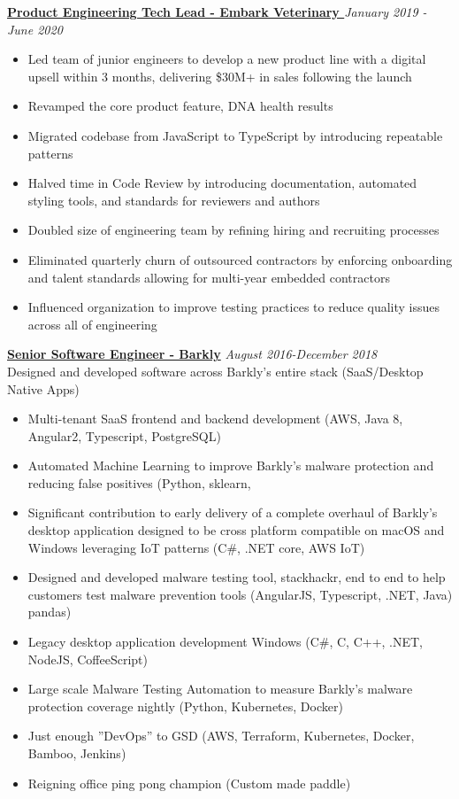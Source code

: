 \documentclass[line]{res}
\begin{document}
\begin{resume}
{\bf \underline{Product Engineering Tech Lead - Embark Veterinary }} \hfill {\sl January 2019 - June 2020}\\[2pt]
 \begin{itemize} \itemsep -1pt %
	\item Led team of junior engineers to develop a new product line with a digital upsell within 3 months, delivering \$30M+ in sales following the launch
	\item Revamped the core product feature, DNA health results
	\item Migrated codebase from JavaScript to TypeScript by introducing repeatable patterns
	\item Halved time in Code Review by introducing documentation, automated styling tools, and standards for reviewers and authors
	\item Doubled size of engineering team by refining hiring and recruiting processes
	\item Eliminated quarterly churn of outsourced contractors by enforcing onboarding and talent standards allowing for multi-year embedded contractors
	\item Influenced organization to improve testing practices to reduce quality issues across all of engineering
 \end{itemize}
 
{\bf \underline{Senior Software Engineer - Barkly}} \hfill {\sl August 2016-December 2018}\\[2pt]
Designed and developed software across Barkly's entire stack (SaaS/Desktop Native Apps)
 \begin{itemize} \itemsep -1pt %
	\item Multi-tenant SaaS frontend and backend development (AWS, Java 8, Angular2, Typescript, PostgreSQL)
	\item Automated Machine Learning to improve Barkly’s malware protection and reducing false positives (Python, sklearn,
	\item Significant contribution to early delivery of a complete overhaul of Barkly’s desktop application designed to be
cross platform compatible on macOS and Windows leveraging IoT patterns (C\#, .NET core, AWS IoT)
	\item Designed and developed malware testing tool, stackhackr, end to end to help customers test malware prevention
tools (AngularJS, Typescript, .NET, Java)
pandas)
	\item Legacy desktop application development Windows (C\#, C, C++, .NET, NodeJS, CoffeeScript)
	\item Large scale Malware Testing Automation to measure Barkly’s malware protection coverage nightly (Python, Kubernetes, Docker)
	\item Just enough ”DevOps” to GSD (AWS, Terraform, Kubernetes, Docker, Bamboo, Jenkins)
	\item Reigning office ping pong champion (Custom made paddle)
 \end{itemize}
 

\end{resume}
\end{document}
